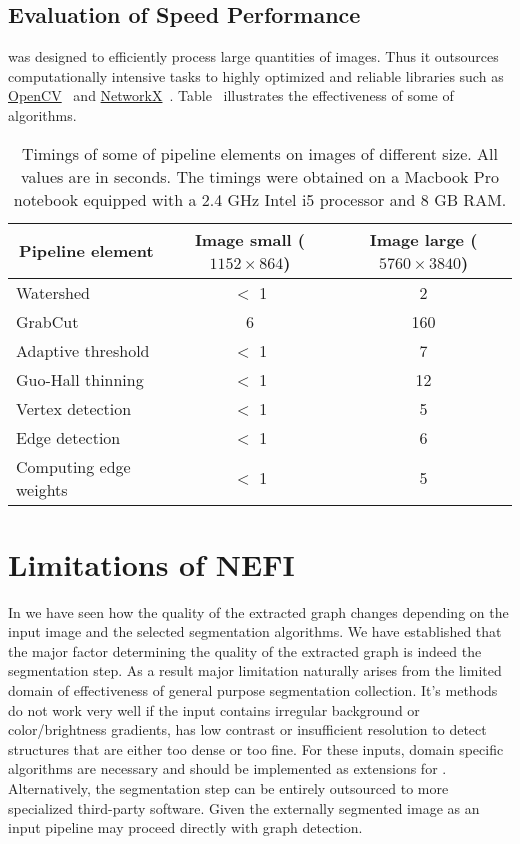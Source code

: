 	\subsection{Evaluation of Speed Performance}

		\NEFI was designed to efficiently process large quantities of images. Thus it outsources computationally intensive tasks to highly optimized and reliable libraries such as \href{http://opencv.org/}{OpenCV}~\cite{opencv} and \href{https://networkx.github.io/documentation/latest/index.html}{NetworkX}~\cite{networkx}. Table~ illustrates the effectiveness of some of \NEFIs algorithms. 


		\begin{table}
			\centering
			\begin{tabular}{@{} l *2c @{}}
			\toprule
			\multicolumn{1}{c}{Pipeline element}    & Image small ($1152 \times 864$)  & Image large ($5760 \times 3840$) \\ 
			\midrule
			Watershed & $<$ 1  & 2  \\
			GrabCut  & 6  & 160  \\
			Adaptive threshold & $<$ 1  & 7  \\
			Guo-Hall thinning &  $<$ 1  & 12  \\
			Vertex detection & $<$ 1  & 5  \\
			Edge detection & $<$ 1   & 6  \\
			Computing edge weights & $<$ 1  & 5 \\
			\bottomrule
			\end{tabular}
			\caption[Timings of \NEFIs pipeline elements]{Timings of some of \NEFIs pipeline elements on images of different size. All values are in seconds. The timings were obtained on a Macbook Pro notebook equipped with a 2.4 GHz Intel i5 processor and 8 GB RAM.}
			\label{tab:timings}
		\end{table}

\section{Limitations of NEFI}

		In we have seen how the quality of the extracted graph changes depending on the input image and the selected segmentation algorithms. We have established that the major factor determining the quality of the extracted graph is indeed the segmentation step. As a result \NEFIs major limitation naturally arises from the limited domain of effectiveness of \NEFIs general purpose segmentation collection. It's methods do not work very well if the input contains irregular background or color/brightness gradients, has low contrast or insufficient resolution to detect structures that are either too dense or too fine. For these inputs, domain specific algorithms are necessary and should be implemented as extensions for \NEFI. Alternatively, the segmentation step can be entirely outsourced to more specialized third-party software. Given the externally segmented image as an input \NEFIs pipeline may proceed directly with graph detection.

